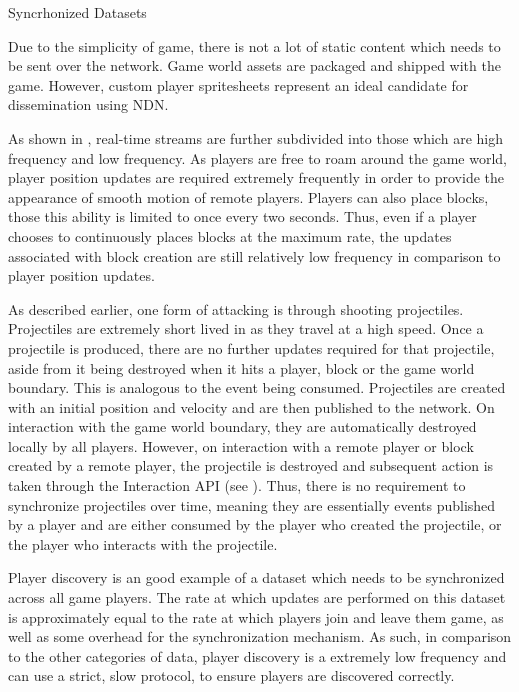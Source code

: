 \begin{labeling}{Syncrhonized Datasets }
    \item[Static Content] Due to the simplicity of game, there is not a lot of static content which needs to be sent over the network. Game world assets are packaged and shipped with the game. However, custom player spritesheets represent an ideal candidate for dissemination using NDN.
    \item[Realtime Streams] As shown in , real-time streams are further subdivided into those which are high frequency and low frequency.\break\break
    As players are free to roam around the game world, player position updates are required extremely frequently in order to provide the appearance of smooth motion of remote players.\break\break
    Players can also place blocks, those this ability is limited to once every two seconds. Thus, even if a player chooses to continuously places blocks at the maximum rate, the updates associated with block creation are still relatively low frequency in comparison to player position updates.
    \item[Non Synced] As described earlier, one form of attacking is through shooting projectiles. Projectiles are extremely short lived in \game{} as they travel at a high speed. Once a projectile is produced, there are no further updates required for that projectile, aside from it being destroyed when it hits a player, block or the game world boundary. This is analogous to the event being consumed. Projectiles are created with an initial position and velocity and are then published to the network. On interaction with the game world boundary, they are automatically destroyed locally by all players. However, on interaction with a remote player or block created by a remote player, the projectile is destroyed and subsequent action is taken through the Interaction API (see ). Thus, there is no requirement to synchronize projectiles over time, meaning they are essentially events published by a player and are either consumed by the player who created the projectile, or the player who interacts with the projectile.
    \item[Syncrhonized Datasets] Player discovery is an good example of a dataset which needs to be synchronized across all game players. The rate at which updates are performed on this dataset is approximately equal to the rate at which players join and leave them game, as well as some overhead for the synchronization mechanism. As such, in comparison to the other categories of data, player discovery is a extremely low frequency and can use a strict, slow protocol, to ensure players are discovered correctly.
\end{labeling}

